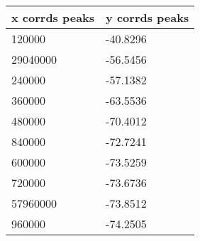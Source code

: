 \begin{tabular}{ll}
x corrds peaks & y corrds peaks \\ 
\hline 
120000 & -40.8296 \\ 
29040000 & -56.5456 \\ 
240000 & -57.1382 \\ 
360000 & -63.5536 \\ 
480000 & -70.4012 \\ 
840000 & -72.7241 \\ 
600000 & -73.5259 \\ 
720000 & -73.6736 \\ 
57960000 & -73.8512 \\ 
960000 & -74.2505 \\ 
\hline 
\end{tabular}